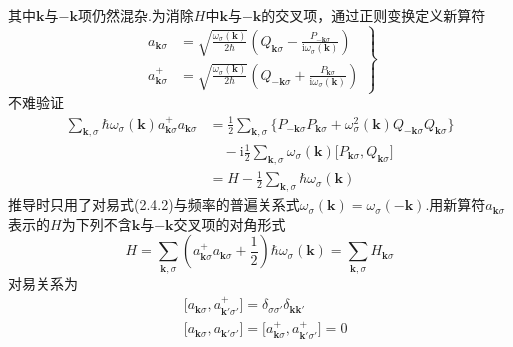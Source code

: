 其中$\boldsymbol{k}$与$-\boldsymbol{k}$项仍然混杂.为消除$H$中$\boldsymbol{k}$与$-\boldsymbol{k}$的交叉项，通过正则变换定义新算符
\begin{equation}
\left.\begin{aligned}
  a_{\boldsymbol{k}\sigma}&=\sqrt{\frac{\omega_{\sigma}(\boldsymbol{k})}{2\hbar}}
  \left(Q_{\boldsymbol{k}\sigma}-\frac{P_{-\boldsymbol{k}\sigma}}{\mathrm{i}\omega_{\sigma}(\boldsymbol{k})}\right)\\[1ex]
  a_{\boldsymbol{k}\sigma}^{+}&=\sqrt{\frac{\omega_{\sigma}(\boldsymbol{k})}{2\hbar}}
  \left(Q_{-\boldsymbol{k}\sigma}+\frac{P_{\boldsymbol{k}\sigma}}{\mathrm{i}\omega_{\sigma}(\boldsymbol{k})}\right)
\end{aligned}\right\}
\end{equation}
不难验证
\begin{equation*}
\begin{aligned}
  \sum_{\boldsymbol{k},\sigma}\hbar\omega_{\sigma}(\boldsymbol{k})a_{\boldsymbol{k}\sigma}^{+}a_{\boldsymbol{k}\sigma}
  &=\frac{1}{2}\sum_{\boldsymbol{k},\sigma}\bigl\{P_{-\boldsymbol{k}\sigma}P_{\boldsymbol{k}\sigma}
  +\omega_{\sigma}^2(\boldsymbol{k})Q_{-\boldsymbol{k}\sigma}Q_{\boldsymbol{k}\sigma}\bigr\}\\
  &\quad-\mathrm{i}\frac{1}{2}\sum_{\boldsymbol{k},\sigma}\omega_{\sigma}(\boldsymbol{k})
  \bigl[P_{\boldsymbol{k}\sigma},Q_{\boldsymbol{k}\sigma}\bigr]\\
  &=H-\frac{1}{2}\sum_{\boldsymbol{k},\sigma}\hbar\omega_{\sigma}(\boldsymbol{k})
\end{aligned}
\end{equation*}
推导时只用了对易式(2.4.2)与频率的普遍关系式$\omega_{\sigma}(\boldsymbol{k})=\omega_{\sigma}(-\boldsymbol{k})$.用新算符$a_{\boldsymbol{k}\sigma}$表示的$H$为下列不含$\boldsymbol{k}$与$-\boldsymbol{k}$交叉项的对角形式
\begin{equation}
  H=\sum_{\boldsymbol{k},\sigma}\left(a_{\boldsymbol{k}\sigma}^{+}a_{\boldsymbol{k}\sigma}
  +\frac{1}{2}\right)\hbar\omega_{\sigma}(\boldsymbol{k})
  =\sum_{\boldsymbol{k},\sigma}H_{\boldsymbol{k}\sigma}
\end{equation}
对易关系为
\begin{equation}
\begin{aligned}
  &\bigl[a_{\boldsymbol{k}\sigma},a_{\boldsymbol{k}'\sigma'}^{+}\bigr]
  =\delta_{\sigma\sigma'}\delta_{\boldsymbol{k}\boldsymbol{k}'}\\
  &\bigl[a_{\boldsymbol{k}\sigma},a_{\boldsymbol{k}'\sigma'}\bigr]
  =\bigl[a_{\boldsymbol{k}\sigma}^{+},a_{\boldsymbol{k}'\sigma'}^{+}\bigr]=0
\end{aligned}
\end{equation}

